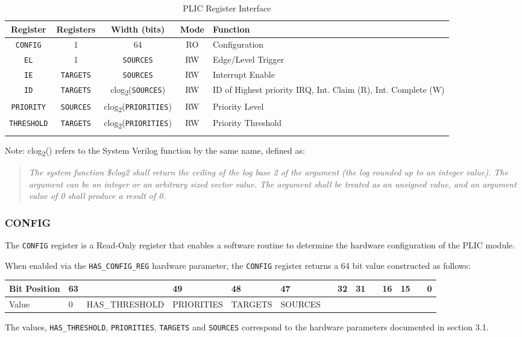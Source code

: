 \begin{longtable}[]{@{}ccccp{3cm}@{}}
\toprule
\textbf{Register} & \textbf{Registers} & \textbf{Width (bits)} & \textbf{Mode} & \textbf{Function}\tabularnewline
\midrule
\endhead
\texttt{CONFIG} & 1 & 64 & RO & Configuration\tabularnewline
\texttt{EL} & 1 & \texttt{SOURCES} & RW & Edge/Level Trigger\tabularnewline
\texttt{IE} & \texttt{TARGETS} & \texttt{SOURCES} & RW & Interrupt Enable\tabularnewline
\texttt{ID} & \texttt{TARGETS} & clog\textsubscript{2}(\texttt{SOURCES}) & RW & ID of Highest priority IRQ, Int. Claim (R), Int. Complete (W)\tabularnewline
\texttt{PRIORITY} & \texttt{SOURCES} & clog\textsubscript{2}(\texttt{PRIORITIES}) & RW & Priority Level\tabularnewline
\texttt{THRESHOLD} & \texttt{TARGETS} & clog\textsubscript{2}(\texttt{PRIORITIES}) & RW & Priority Threshold\tabularnewline
\bottomrule
\caption{PLIC Register Interface}
\label{tab:REGIF}
\end{longtable}

Note: clog\textsubscript{2}() refers to the System Verilog function by
the same name, defined as:

\begin{quote}
\emph{The system function \$clog2 shall return the ceiling of the log
base 2 of the argument (the log rounded up to an integer value). The
argument can be an integer or an arbitrary sized vector value. The
argument shall be treated as an unsigned value, and an argument value of
0 shall produce a result of 0.}
\end{quote}

\subsubsection{CONFIG}

The \texttt{CONFIG} register is a Read-Only register that enables a
software routine to determine the hardware configuration of the PLIC
module.

When enabled via the \texttt{HAS\_CONFIG\_REG} hardware parameter, the
\texttt{CONFIG} register returns a 64 bit value constructed as follows:

\begin{longtable}[]{@{}llllllllllllll@{}}
\toprule
Bit Position & 63 & & 49 & 48 & 47 & & 32 & 31 & & 16 & 15 & &
0\tabularnewline
\midrule
\endhead
Value & 0 & HAS\_THRESHOLD & PRIORITIES & TARGETS & SOURCES & & & & & &
& &\tabularnewline
\bottomrule
\end{longtable}

The values, \texttt{HAS\_THRESHOLD}, \texttt{PRIORITIES},
\texttt{TARGETS} and \texttt{SOURCES} correspond to the hardware
parameters documented in section 3.1.


